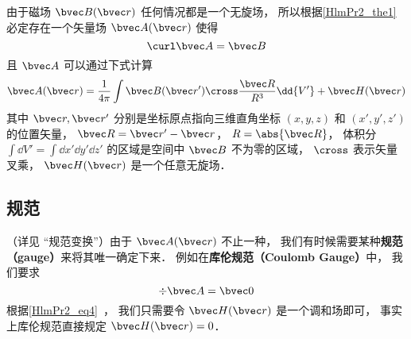 
\begin{issues}
\issueDraft
{}
\end{issues}


由于磁场 $\bvec B(\bvec r)$ 任何情况都是一个无旋场， 所以根据\autoref{HlmPr2_the1}~ 必定存在一个矢量场 $\bvec A(\bvec r)$ 使得
\begin{equation}
\curl \bvec A = \bvec B
\end{equation}
且 $\bvec A$ 可以通过下式计算
\begin{equation}
\bvec A(\bvec r) = \frac{1}{4\pi} \int \bvec B(\bvec r') \cross \frac{\bvec R}{R^3} \dd{V'} + \bvec H(\bvec r)
\end{equation}
其中 $\bvec r, \bvec r'$ 分别是坐标原点指向三维直角坐标 $(x, y, z)$ 和 $(x', y', z')$ 的位置矢量， $\bvec R = \bvec r' - \bvec r$， $R = \abs{\bvec R}$， 体积分 $\int\dd{V'} = \int\dd{x'}\dd{y'}\dd{z'}$ 的区域是空间中 $\bvec B$ 不为零的区域， $\cross$ 表示矢量叉乘， $\bvec H(\bvec r)$ 是一个任意无旋场．

\subsection{规范}
（详见 “规范变换”）由于 $\bvec A(\bvec r)$ 不止一种， 我们有时候需要某种\textbf{规范（gauge）}来将其唯一确定下来． 例如在\textbf{库伦规范（Coulomb Gauge）}中， 我们要求
\begin{equation}
\div \bvec A = \bvec 0
\end{equation}
根据\autoref{HlmPr2_eq4}~， 我们只需要令 $\bvec H(\bvec r)$ 是一个调和场即可， 事实上库伦规范直接规定 $\bvec H(\bvec r) = 0$．

